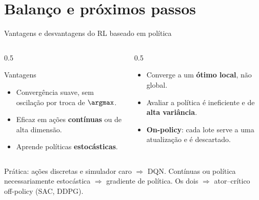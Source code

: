 \documentclass[aspectratio=169, 11pt]{beamer}
\begin{document}
\section{Balanço e próximos passos}

\begin{frame}{Vantagens e desvantagens do RL baseado em política}

  \begin{columns}[T]
  \begin{column}{0.5\textwidth}
    \begin{defbox}{Vantagens}
      \begin{itemize}\setlength{\itemsep}{0.2ex}
        \item Convergência suave, sem oscilação por troca de $\argmax$.
        \item Eficaz em ações \textbf{contínuas} ou de alta dimensão.
        \item Aprende políticas \textbf{estocásticas}.
      \end{itemize}
    \end{defbox}
  \end{column}
  \begin{column}{0.5\textwidth}
    \begin{alertabox}
      \begin{itemize}\setlength{\itemsep}{0.2ex}
        \item Converge a um \textbf{ótimo local}, não global.
        \item Avaliar a política é ineficiente e de \textbf{alta variância}.
        \item \textbf{On-policy}: cada lote serve a uma atualização e é
          descartado.
      \end{itemize}
    \end{alertabox}
  \end{column}
  \end{columns}

  \begin{ideiabox}
    Prática: ações discretas e simulador caro $\Rightarrow$ DQN. Contínuas ou
    política necessariamente estocástica $\Rightarrow$ gradiente de política.
    Os dois $\Rightarrow$ ator--crítico off-policy (SAC, DDPG).
  \end{ideiabox}
\end{frame}
\end{document}

